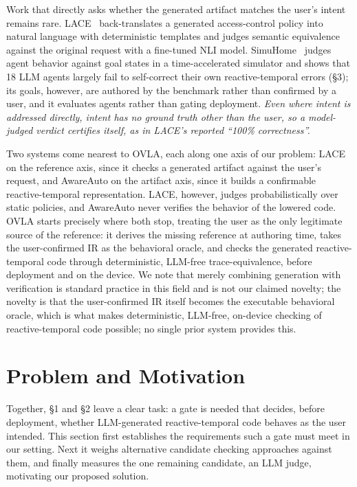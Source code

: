 \documentclass[sigconf,nonacm,anonymous,review]{acmart}
\begin{document}
Work that directly asks whether the generated artifact matches the user's intent remains rare. LACE~\cite{lace} back-translates a generated access-control policy into natural language with deterministic templates and judges semantic equivalence against the original request with a fine-tuned NLI model. SimuHome~\cite{simuhome} judges agent behavior against goal states in a time-accelerated simulator and shows that 18 LLM agents largely fail to self-correct their own reactive-temporal errors (\S3); its goals, however, are authored by the benchmark rather than confirmed by a user, and it evaluates agents rather than gating deployment. \emph{Even where intent is addressed directly, intent has no ground truth other than the user, so a model-judged verdict certifies itself, as in LACE's reported ``100\% correctness''.}

Two systems come nearest to OVLA, each along one axis of our problem: LACE on the reference axis, since it checks a generated artifact against the user's request, and AwareAuto on the artifact axis, since it builds a confirmable reactive-temporal representation. LACE, however, judges probabilistically over static policies, and AwareAuto never verifies the behavior of the lowered code. OVLA starts precisely where both stop, treating the user as the only legitimate source of the reference: it derives the missing reference at authoring time, takes the user-confirmed IR as the behavioral oracle, and checks the generated reactive-temporal code through deterministic, LLM-free trace-equivalence, before deployment and on the device. We note that merely combining generation with verification is standard practice in this field and is not our claimed novelty; the novelty is that the user-confirmed IR itself becomes the executable behavioral oracle, which is what makes deterministic, LLM-free, on-device checking of reactive-temporal code possible; no single prior system provides this.

\section{Problem and Motivation}

Together, \S1 and \S2 leave a clear task: a gate is needed that decides, before deployment, whether LLM-generated reactive-temporal code behaves as the user intended. This section first establishes the requirements such a gate must meet in our setting. Next it weighs alternative candidate checking approaches against them, and finally measures the one remaining candidate, an LLM judge, motivating our proposed solution.
\end{document}

